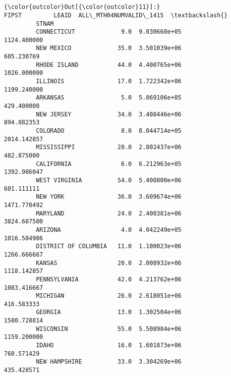\documentclass[11pt]{article}
\begin{document}
    \begin{center}
    \end{center}
    { \hspace*{\fill} \\}
    
    \begin{center}
    \end{center}
    { \hspace*{\fill} \\}
    
\begin{Verbatim}[commandchars=\\\{\}]
{\color{outcolor}Out[{\color{outcolor}11}]:}                       FIPST         LEAID  ALL\_MTH04NUMVALID\_1415  \textbackslash{}
         STNAM                                                               
         CONNECTICUT             9.0  9.030660e+05             1124.400000   
         NEW MEXICO             35.0  3.501039e+06              605.230769   
         RHODE ISLAND           44.0  4.400765e+06             1026.000000   
         ILLINOIS               17.0  1.722342e+06             1199.240000   
         ARKANSAS                5.0  5.069106e+05              429.400000   
         NEW JERSEY             34.0  3.408446e+06              894.882353   
         COLORADO                8.0  8.044714e+05             2014.142857   
         MISSISSIPPI            28.0  2.802437e+06              482.875000   
         CALIFORNIA              6.0  6.212963e+05             1392.986047   
         WEST VIRGINIA          54.0  5.400800e+06              601.111111   
         NEW YORK               36.0  3.609674e+06             1471.770492   
         MARYLAND               24.0  2.400381e+06             3824.687500   
         ARIZONA                 4.0  4.042249e+05             1016.584906   
         DISTRICT OF COLUMBIA   11.0  1.100023e+06             1266.666667   
         KANSAS                 20.0  2.008932e+06             1118.142857   
         PENNSYLVANIA           42.0  4.213762e+06             1083.416667   
         MICHIGAN               26.0  2.618051e+06              416.583333   
         GEORGIA                13.0  1.302504e+06             1580.728814   
         WISCONSIN              55.0  5.508984e+06             1159.200000   
         IDAHO                  16.0  1.601873e+06              760.571429   
         NEW HAMPSHIRE          33.0  3.304269e+06              435.428571   

\end{Verbatim}
\end{document}
